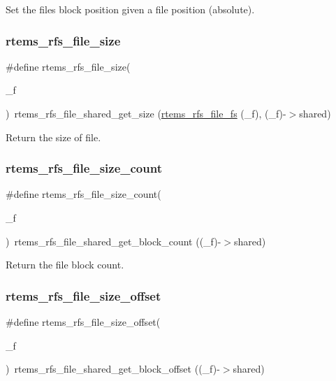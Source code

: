 Set the file\textquotesingle{}s block position given a file position (absolute). \mbox{\label{rtems-rfs-file_8h_ad621f6c4bf9e335c18993c6d07d41ef3}} 
\subsubsection{\texorpdfstring{rtems\_rfs\_file\_size}{rtems\_rfs\_file\_size}}
{\footnotesize\ttfamily \#define rtems\+\_\+rfs\+\_\+file\+\_\+size(\begin{DoxyParamCaption}\item[{}]{\+\_\+f }\end{DoxyParamCaption})~rtems\+\_\+rfs\+\_\+file\+\_\+shared\+\_\+get\+\_\+size (\mbox{\hyperlink{rtems-rfs-file_8h_a4c7546d9fdb507dcd132e994a235242a}{rtems\+\_\+rfs\+\_\+file\+\_\+fs}} (\+\_\+f), (\+\_\+f)-\/$>$shared)}

Return the size of file. \mbox{\label{rtems-rfs-file_8h_a72061aa35cafb586f2a3ca883dd2d67e}} 
\subsubsection{\texorpdfstring{rtems\_rfs\_file\_size\_count}{rtems\_rfs\_file\_size\_count}}
{\footnotesize\ttfamily \#define rtems\+\_\+rfs\+\_\+file\+\_\+size\+\_\+count(\begin{DoxyParamCaption}\item[{}]{\+\_\+f }\end{DoxyParamCaption})~rtems\+\_\+rfs\+\_\+file\+\_\+shared\+\_\+get\+\_\+block\+\_\+count ((\+\_\+f)-\/$>$shared)}

Return the file block count. \mbox{\label{rtems-rfs-file_8h_ae687fe1a9f2f8f1fe653fb872f70c1dc}} 
\subsubsection{\texorpdfstring{rtems\_rfs\_file\_size\_offset}{rtems\_rfs\_file\_size\_offset}}
{\footnotesize\ttfamily \#define rtems\+\_\+rfs\+\_\+file\+\_\+size\+\_\+offset(\begin{DoxyParamCaption}\item[{}]{\+\_\+f }\end{DoxyParamCaption})~rtems\+\_\+rfs\+\_\+file\+\_\+shared\+\_\+get\+\_\+block\+\_\+offset ((\+\_\+f)-\/$>$shared)}

